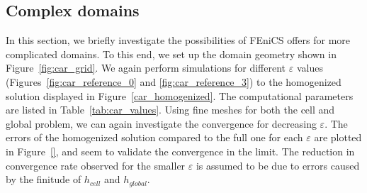 \documentclass{article}
\renewcommand{\epsilon}{\varepsilon}
\begin{document}
  \subsection{Complex domains}\label{sec:car}
  In this section, we briefly investigate the possibilities of FEniCS offers for more complicated domains. To this end, we set up the domain geometry shown in Figure~\ref{fig:car_grid}. We again perform simulations for different $\epsilon$ values (Figures~\ref{fig:car_reference_0} and \ref{fig:car_reference_3}) to the homogenized solution displayed in Figure~\ref{car_homogenized}. The computational parameters are listed in Table~\ref{tab:car_values}. Using fine meshes for both the cell and global problem, we can again investigate the convergence for decreasing $\epsilon$. The errors of the homogenized solution compared to the full one for each $\epsilon$ are plotted in Figure~\ref{}, and seem to validate the convergence in the limit. The reduction in convergence rate observed for the smaller $\epsilon$ is assumed to be due to errors caused by the finitude of $h_{cell}$ and $h_{global}$. 
  
\end{document}
